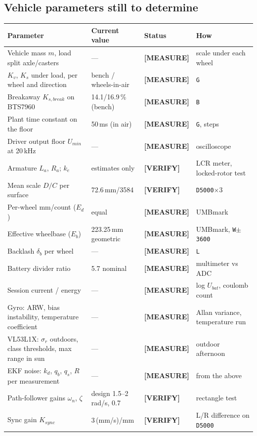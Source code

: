 \documentclass[11pt,a4paper]{article}
\newcommand{\mk}[2]{\textsf{\scriptsize\bfseries\colorbox{#1bg}{\color{#1}[#2]}}}
\newcommand{\MEASURE}{\mk{warn}{MEASURE}}
\newcommand{\VERIFY}{\mk{cold}{VERIFY}}
\newcommand{\code}[1]{\texttt{\small #1}}
\begin{document}
\subsection{Vehicle parameters still to determine}\label{sec:open-params}

\begin{center}
\small
\begin{tabularx}{\textwidth}{@{}P{55mm}P{27mm}lL@{}}
\toprule
\textbf{Parameter} & \textbf{Current value} & \textbf{Status} & \textbf{How}\\
\midrule
Vehicle mass $m$, load split axle/casters & --- & \MEASURE & scale under each wheel\\
$K_v$, $K_s$ under load, per wheel and direction & bench / wheels-in-air & \MEASURE & \code{G}\\
Breakaway $K_{s,break}$ on BTS7960 & 14.1/16.9\,\% (bench) & \MEASURE & \code{B}\\
Plant time constant on the floor & 50\,ms (in air) & \MEASURE & \code{G}, steps\\
Driver output floor $U_{min}$ at 20\,kHz & --- & \MEASURE & oscilloscope\\
Armature $L_a$, $R_a$; $k_e$ & estimates only & \VERIFY & LCR meter, locked-rotor test\\
Mean scale $D/C$ per surface & 72.6\,mm/3584 & \VERIFY & \code{D5000}$\times3$\\
Per-wheel mm/count ($E_d$) & equal & \MEASURE & UMBmark\\
Effective wheelbase ($E_b$) & 223.25\,mm geometric & \MEASURE & UMBmark, \code{W$\pm$3600}\\
Backlash $\delta_b$ per wheel & --- & \MEASURE & \code{L}\\
Battery divider ratio & 5.7 nominal & \MEASURE & multimeter vs ADC\\
Session current / energy & --- & \MEASURE & log $U_{bat}$, coulomb count\\
Gyro: ARW, bias instability, temperature coefficient & --- & \MEASURE & Allan variance, temperature run\\
VL53L1X: $\sigma_r$ outdoors, class thresholds, max range in sun & --- & \MEASURE & outdoor afternoon\\
EKF noise: $k_d$, $q_b$, $q_s$, $R$ per measurement & --- & \MEASURE & from the above\\
Path-follower gains $\omega_n$, $\zeta$ & design 1.5--2\,rad/s, 0.7 & \VERIFY & rectangle test\\
Sync gain $K_{sync}$ & 3\,(mm/s)/mm & \VERIFY & L/R difference on \code{D5000}\\
\bottomrule
\end{tabularx}
\end{center}
\end{document}
